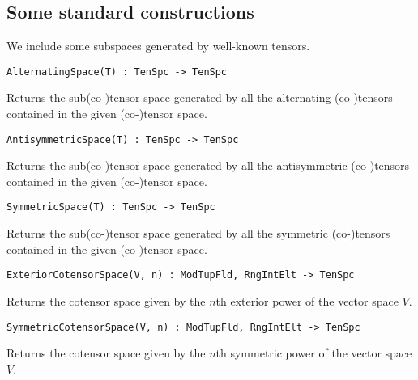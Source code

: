 \subsection{Some standard constructions}

We include some subspaces generated by well-known tensors.

\color{blue}
{\small \begin{verbatim}
AlternatingSpace(T) : TenSpc -> TenSpc
\end{verbatim} }
\color{black}

Returns the sub(co-)tensor space generated by all the alternating (co-)tensors contained in the given (co-)tensor space.

\color{blue}
{\small \begin{verbatim}
AntisymmetricSpace(T) : TenSpc -> TenSpc
\end{verbatim} }
\color{black}

Returns the sub(co-)tensor space generated by all the antisymmetric (co-)tensors contained in the given (co-)tensor space.

\color{blue}
{\small \begin{verbatim}
SymmetricSpace(T) : TenSpc -> TenSpc
\end{verbatim} }
\color{black}

Returns the sub(co-)tensor space generated by all the symmetric (co-)tensors contained in the given (co-)tensor space.

\color{blue}
{\small \begin{verbatim}
ExteriorCotensorSpace(V, n) : ModTupFld, RngIntElt -> TenSpc
\end{verbatim} }
\color{black}

Returns the cotensor space given by the $n$th exterior power of the vector space $V$.

\color{blue}
{\small \begin{verbatim}
SymmetricCotensorSpace(V, n) : ModTupFld, RngIntElt -> TenSpc
\end{verbatim} }
\color{black}

Returns the cotensor space given by the $n$th symmetric power of the vector space $V$.

